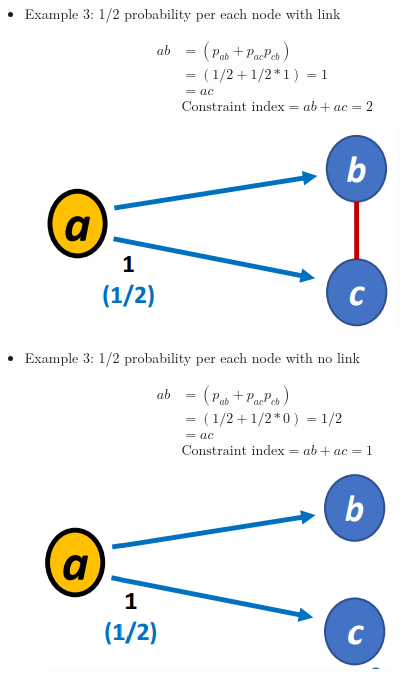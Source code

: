 \documentclass[
  notitlepage,
  onecolumn,
  openany]{book}
\begin{document}
\begin{itemize}
\item
  Example 3: 1/2 probability per each node with link

  \[
    \begin{aligned}
    ab &= (p_{ab}+p_{ac}p_{cb})
    \\&= (1/2+1/2*1)=1\\
    & = ac\\
    &\text{Constraint index} = ab+ac= 2
    \end{aligned}
    \]
\end{itemize}

\begin{figure}[h!]

{\centering \includegraphics[width=0.4\linewidth]{images/08-Metrics for structural holes/Untitled 2} 

}

\end{figure}

\begin{itemize}
\item
  Example 3: 1/2 probability per each node with no link

  \[
    \begin{aligned}
    ab &= (p_{ab}+p_{ac}p_{cb})
    \\&= (1/2+1/2*0)=1/2\\
    & = ac\\
    &\text{Constraint index} = ab+ac= 1
    \end{aligned}
    \]
\end{itemize}

\begin{figure}[h!]

{\centering \includegraphics[width=0.4\linewidth]{images/08-Metrics for structural holes/Untitled 3} 

}

\end{figure}
\end{document}
